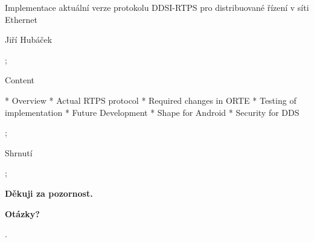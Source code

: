 

\worktype[M/CZ]

\slideshow

\tit Implementace aktuální verze protokolu DDSI-RTPS pro distribuované řízení v síti Ethernet

\subtit Jiří Hubáček

\pg;


\sec Content

* Overview
* Actual RTPS protocol
* Required changes in ORTE
* Testing of implementation
* Future Development
* Shape for Android
* Security for DDS

\pg;










\sec Shrnutí

\pg;

\null
\vskip2cm
\centerline{\typosize[35/40]\bf Děkuji za pozornost.}

\vskip2cm
\centerline{\Blue\typosize[60/70]\bf Otázky?}

\pg.
